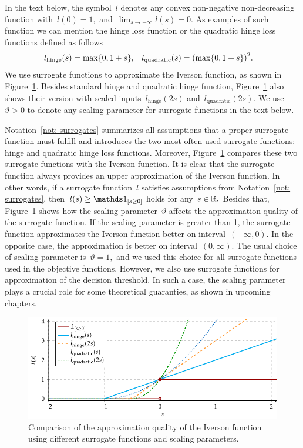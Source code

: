 \begin{notation}\label{not: surrogates}
  In the text below, the symbol~$l$ denotes any convex non-negative non-decreasing function with~$l(0) = 1,$ and~$\lim_{s \to -\infty} l(s) = 0.$ As examples of such function we can mention the hinge loss function or the quadratic hinge loss functions defined as follows
  \begin{align*}
    l_{\text{hinge}}(s) & = \max\Brac[c]{0, 1 + s}, &
    l_{\text{quadratic}}(s) & = \Brac{\max\Brac[c]{0, 1 + s}}^2.
  \end{align*}
  We use surrogate functions to approximate the Iverson function, as shown in Figure~\ref{fig: surrogates}. Besides standard hinge and quadratic hinge function, Figure~\ref{fig: surrogates} also shows their version with scaled inputs~$l_{\text{hinge}}(2s)$ and~$l_{\text{quadratic}}(2s).$ We use~$\vartheta > 0$ to denote any scaling parameter for surrogate functions in the text below.
\end{notation}

Notation~\ref{not: surrogates} summarizes all assumptions that a proper surrogate function must fulfill and introduces the two most often used surrogate functions: hinge and quadratic hinge loss functions. Moreover, Figure~\ref{fig: surrogates} compares these two surrogate functions with the Iverson function. It is clear that the surrogate function always provides  an upper approximation of the Iverson function. In other words, if a surrogate function~$l$ satisfies assumptions from Notation~\ref{not: surrogates}, then~$l(s) \geq \Iverson{s \geq 0}$ holds for any~$s \in \mathbb{R}.$ Besides that, Figure~\ref{fig: surrogates} shows how the scaling parameter~$\vartheta$ affects the approximation quality of the surrogate function. If the scaling parameter is greater than 1, the surrogate function approximates the Iverson function better on interval~$(-\infty, 0)$. In the opposite case, the approximation is better on interval~$(0, \infty)$. The usual choice of scaling parameter is~$\vartheta = 1,$ and we used this choice for all surrogate functions used in the objective functions. However, we also use surrogate functions for approximation of the decision threshold. In such a case, the scaling parameter plays a crucial role for some theoretical guaranties, as shown in upcoming chapters.

\begin{figure}[t]
  \centering
  \includegraphics[width = \linewidth]{images/surrogates.pdf}
  \caption{Comparison of the approximation quality of the Iverson function using different surrogate functions and scaling parameters.}
  \label{fig: surrogates}
\end{figure}

